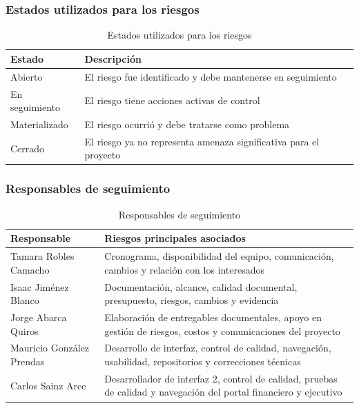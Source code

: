 \documentclass[11pt,spanish]{article}
\begin{document}
\subsubsection{Estados utilizados para los riesgos}

\begin{table}[H]
\centering
\caption{Estados utilizados para los riesgos}
\label{tab-estados-riesgos-registro}
{\small
\begin{tabularx}{\textwidth}{p{4cm} Y}
\toprule
\textbf{Estado} & \textbf{Descripción} \\
\midrule
Abierto & El riesgo fue identificado y debe mantenerse en seguimiento \\
En seguimiento & El riesgo tiene acciones activas de control \\
Materializado & El riesgo ocurrió y debe tratarse como problema \\
Cerrado & El riesgo ya no representa amenaza significativa para el proyecto \\
\bottomrule
\end{tabularx}
}
\end{table}

\subsubsection{Responsables de seguimiento}

\begin{table}[H]
\centering
\caption{Responsables de seguimiento}
\label{tab-responsables-seguimiento}
{\small
\begin{tabularx}{\textwidth}{p{4.5cm} Y}
\toprule
\textbf{Responsable} & \textbf{Riesgos principales asociados} \\
\midrule
Tamara Robles Camacho & Cronograma, disponibilidad del equipo, comunicación, cambios y relación con los interesados \\
Isaac Jiménez Blanco & Documentación, alcance, calidad documental, presupuesto, riesgos, cambios y evidencia \\
Jorge Abarca Quiros & Elaboración de entregables documentales, apoyo en gestión de riesgos, costos y comunicaciones del proyecto \\
Mauricio González Prendas & Desarrollo de interfaz, control de calidad, navegación, usabilidad, repositorios y correcciones técnicas \\
Carlos Sainz Arce & Desarrollador de interfaz 2, control de calidad, pruebas de calidad y navegación del portal financiero y ejecutivo \\
\bottomrule
\end{tabularx}
}
\end{table}
\end{document}
